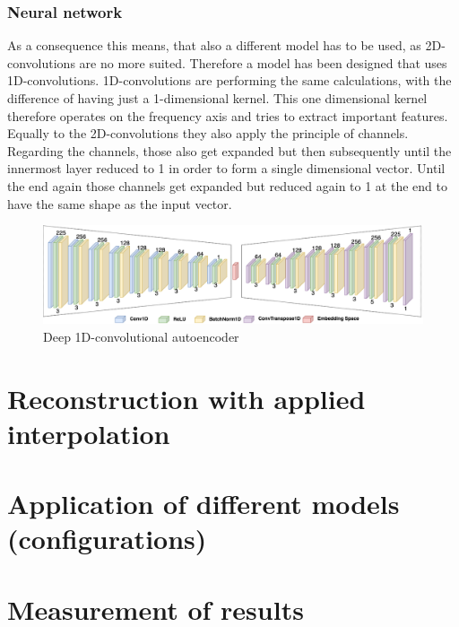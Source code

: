 \subsubsection{Neural network}
As a consequence this means, that also a different model has to be used, as 2D-convolutions are no more suited. Therefore a model has been designed that uses 1D-convolutions. 1D-convolutions are performing the same calculations, with the difference of having just a 1-dimensional kernel. This one dimensional kernel therefore operates on the frequency axis and tries to extract important features. Equally to the 2D-convolutions they also apply the principle of channels. Regarding the channels, those also get expanded but then subsequently until the innermost layer reduced to 1 in order to form a single dimensional vector. Until the end again those channels get expanded but reduced again to 1 at the end to have the same shape as the input vector. 

 \begin{figure}[htb!]
	\caption{Deep 1D-convolutional autoencoder}
	\label{fig:cae_1D}
	\centering
	\includegraphics[width=\textwidth]{images/experiments/autoencoder_deep_1D.png}
\end{figure}

\section{Reconstruction with applied interpolation}

\section{Application of different models (configurations)}

\section{Measurement of results}